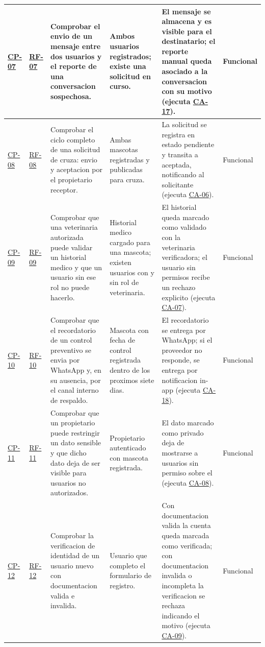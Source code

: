 \documentclass[journal,onecolumn]{IEEEtran}
\begin{document}
\begin{landscape}
\begin{longtable}{@{}p{1.3cm} p{1.3cm} p{4.6cm} p{3.6cm} p{5.2cm} p{1.6cm}@{}}
			\hyperref[cp:07]{CP-07}\label{cp:07} & \hyperref[tab:RF-07]{RF-07} & Comprobar el envio de un mensaje entre dos usuarios y el reporte de una conversacion sospechosa. & Ambos usuarios registrados; existe una solicitud en curso. & El mensaje se almacena y es visible para el destinatario; el reporte manual queda asociado a la conversacion con su motivo (ejecuta \hyperref[lst:ca17]{CA-17}). & Funcional \\ \midrule
			\hyperref[cp:08]{CP-08}\label{cp:08} & \hyperref[tab:RF-08]{RF-08} & Comprobar el ciclo completo de una solicitud de cruza: envio y aceptacion por el propietario receptor. & Ambas mascotas registradas y publicadas para cruza. & La solicitud se registra en estado pendiente y transita a aceptada, notificando al solicitante (ejecuta \hyperref[lst:ca06]{CA-06}). & Funcional \\ \midrule
			\hyperref[cp:09]{CP-09}\label{cp:09} & \hyperref[tab:RF-09]{RF-09} & Comprobar que una veterinaria autorizada puede validar un historial medico y que un usuario sin ese rol no puede hacerlo. & Historial medico cargado para una mascota; existen usuarios con y sin rol de veterinaria. & El historial queda marcado como validado con la veterinaria verificadora; el usuario sin permisos recibe un rechazo explicito (ejecuta \hyperref[lst:ca07]{CA-07}). & Funcional \\ \midrule
			\hyperref[cp:10]{CP-10}\label{cp:10} & \hyperref[tab:RF-10]{RF-10} & Comprobar que el recordatorio de un control preventivo se envia por WhatsApp y, en su ausencia, por el canal interno de respaldo. & Mascota con fecha de control registrada dentro de los proximos siete dias. & El recordatorio se entrega por WhatsApp; si el proveedor no responde, se entrega por notificacion in-app (ejecuta \hyperref[lst:ca18]{CA-18}). & Funcional \\ \midrule
			\hyperref[cp:11]{CP-11}\label{cp:11} & \hyperref[tab:RF-11]{RF-11} & Comprobar que un propietario puede restringir un dato sensible y que dicho dato deja de ser visible para usuarios no autorizados. & Propietario autenticado con mascota registrada. & El dato marcado como privado deja de mostrarse a usuarios sin permiso sobre el (ejecuta \hyperref[lst:ca08]{CA-08}). & Funcional \\ \midrule
			\hyperref[cp:12]{CP-12}\label{cp:12} & \hyperref[tab:RF-12]{RF-12} & Comprobar la verificacion de identidad de un usuario nuevo con documentacion valida e invalida. & Usuario que completo el formulario de registro. & Con documentacion valida la cuenta queda marcada como verificada; con documentacion invalida o incompleta la verificacion se rechaza indicando el motivo (ejecuta \hyperref[lst:ca09]{CA-09}). & Funcional \\ \midrule

\end{longtable}
\end{landscape}
\end{document}
